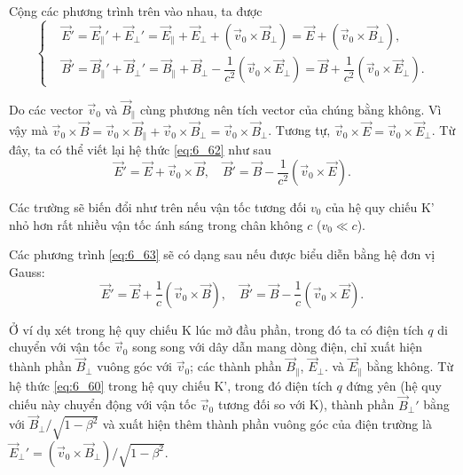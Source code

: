 \noindent
Cộng các phương trình trên vào nhau, ta được
\begin{equation}\label{eq:6_62}
    \begin{cases}
        & \!\!\!\!\! \vec{E}' = \vec{E}_{\parallel}' + \vec{E}_{\perp}' = \vec{E}_{\parallel} + \vec{E}_{\perp} + (\vec{v}_0 \times \vec{B}_{\perp}) = \vec{E} + (\vec{v}_0 \times \vec{B}_{\perp}),\\
        & \!\!\!\!\! \vec{B}' = \vec{B}_{\parallel}' + \vec{B}_{\perp}' = \vec{B}_{\parallel} + \vec{B}_{\perp} - \dfrac{1}{c^2} (\vec{v}_0 \times \vec{E}_{\perp}) = \vec{B} + \dfrac{1}{c^2} (\vec{v}_0 \times \vec{E}_{\perp}).
    \end{cases}
\end{equation}

Do các vector $\vec{v}_0$ và $\vec{B}_{\parallel}$ cùng phương nên tích vector của chúng bằng không. Vì vậy mà $\vec{v}_0 \times \vec{B} = \vec{v}_0 \times \vec{B}_{\parallel} + \vec{v}_0 \times \vec{B}_{\perp} = \vec{v}_0 \times \vec{B}_{\perp}$.
Tương tự, $\vec{v}_0 \times \vec{E} = \vec{v}_0 \times \vec{E}_{\perp}$. Từ đây, ta có thể viết lại hệ thức \eqref{eq:6_62} như sau
\begin{equation}\label{eq:6_63}
    \vec{E}' = \vec{E} + \vec{v}_0 \times \vec{B},\quad \vec{B}' = \vec{B} - \dfrac{1}{c^2} (\vec{v}_0 \times \vec{E}).
\end{equation}

\noindent
Các trường sẽ biến đổi như trên nếu vận tốc tương đối $v_0$ của hệ quy chiếu K' nhỏ hơn rất nhiều vận tốc ánh sáng trong chân không $c$ ($v_0\ll c$).

Các phương trình \eqref{eq:6_63} sẽ có dạng sau nếu được biểu diễn bằng hệ đơn vị Gauss:
\begin{equation}\label{eq:6_64}
    \vec{E}' = \vec{E} + \dfrac{1}{c} (\vec{v}_0 \times \vec{B}),\quad \vec{B}' = \vec{B} - \dfrac{1}{c} (\vec{v}_0 \times \vec{E}).
\end{equation}

Ở ví dụ xét trong hệ quy chiếu K lúc mở đầu phần, trong đó ta có điện tích $q$  di chuyển với vận tốc $\vec{v}_0$ song song với dây dẫn mang dòng điện, chỉ xuất hiện thành phần $\vec{B}_{\perp}$ vuông góc với $\vec{v}_0$; các thành phần $\vec{B}_{\parallel}$, $\vec{E}_{\perp}$. và $\vec{E}_{\parallel}$ bằng không.
Từ hệ thức \eqref{eq:6_60} trong hệ quy chiếu K', trong đó điện tích $q$ đứng yên (hệ quy chiếu này chuyển động với vận tốc $\vec{v}_0$ tương đối so với K), thành phần $\vec{B}_{\perp}'$ bằng với $\vec{B}_{\perp}/\sqrt{1-\beta^2}$ và xuất hiện thêm thành phần vuông góc của điện trường là $\vec{E}_{\perp}'=(\vec{v}_0 \times \vec{B}_{\perp})/\sqrt{1-\beta^2}$.

